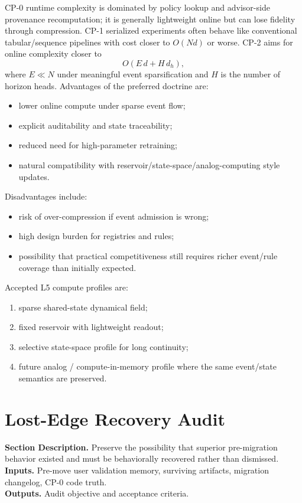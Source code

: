 \documentclass[11pt]{report}
\newcommand{\meta}[3]{\textbf{Section Description.} #1\\
\textbf{Inputs.} #2\\
\textbf{Outputs.} #3\par}
\begin{document}
CP-0 runtime complexity is dominated by policy lookup and advisor-side provenance recomputation; it is generally lightweight online but can lose fidelity through compression. CP-1 serialized experiments often behave like conventional tabular/sequence pipelines with cost closer to $O(Nd)$ or worse. CP-2 aims for online complexity closer to
\[
O(E\,d + H\,d_h),
\]
where $E\ll N$ under meaningful event sparsification and $H$ is the number of horizon heads. Advantages of the preferred doctrine are:
\begin{itemize}
    \item lower online compute under sparse event flow;
    \item explicit auditability and state traceability;
    \item reduced need for high-parameter retraining;
    \item natural compatibility with reservoir/state-space/analog-computing style updates.
\end{itemize}
Disadvantages include:
\begin{itemize}
    \item risk of over-compression if event admission is wrong;
    \item high design burden for registries and rules;
    \item possibility that practical competitiveness still requires richer event/rule coverage than initially expected.
\end{itemize}
Accepted L5 compute profiles are:
\begin{enumerate}[leftmargin=1.2cm]
    \item sparse shared-state dynamical field;
    \item fixed reservoir with lightweight readout;
    \item selective state-space profile for long continuity;
    \item future analog / compute-in-memory profile where the same event/state semantics are preserved.
\end{enumerate}

\section{Lost-Edge Recovery Audit}
\meta{Preserve the possibility that superior pre-migration behavior existed and must be behaviorally recovered rather than dismissed.}{Pre-move user validation memory, surviving artifacts, migration changelog, CP-0 code truth.}{Audit objective and acceptance criteria.}
\end{document}
